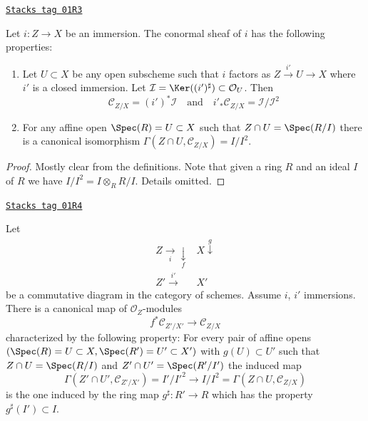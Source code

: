\begin{lemma}
\label{morphisms-lemma-affine-conormal}
\href{https://stacks.math.columbia.edu/tag/01R3}{\texttt{Stacks tag 01R3}}

Let $i : Z \to X$ be an immersion. The conormal sheaf
of $i$ has the following properties:
\begin{enumerate}
\item Let $U \subset X$ be any open subscheme such that $i$
factors as $Z \xrightarrow{i'} U \to X$ where $i'$ is a closed
immersion. Let $\mathcal{I} = \Ker((i')^\sharp) \subset \mathcal{O}_U$.
Then
$$
\mathcal{C}_{Z/X} = (i')^*\mathcal{I}\quad\text{and}\quad
i'_*\mathcal{C}_{Z/X} = \mathcal{I}/\mathcal{I}^2
$$
\item
For any affine open $\Spec(R) = U \subset X$
such that $Z \cap U = \Spec(R/I)$ there is a
canonical isomorphism
$\Gamma(Z \cap U, \mathcal{C}_{Z/X}) = I/I^2$.
\end{enumerate}
\end{lemma}

\begin{proof}
Mostly clear from the definitions. Note that given a ring $R$ and
an ideal $I$ of $R$ we have $I/I^2 = I \otimes_R R/I$. Details omitted.
\end{proof}

\begin{lemma}
\label{morphisms-lemma-conormal-functorial}
\href{https://stacks.math.columbia.edu/tag/01R4}{\texttt{Stacks tag 01R4}}

Let
$$
\begin{array}{cc}Z \underset{i}{\longrightarrow}\underset{f}{\downarrow} & X \overset{g}{\downarrow} \\ Z' \overset{i'}{\longrightarrow} & X'\end{array}
$$
be a commutative diagram in the category of schemes.
Assume $i$, $i'$ immersions. There is a canonical map
of $\mathcal{O}_Z$-modules
$$
f^*\mathcal{C}_{Z'/X'}
\longrightarrow
\mathcal{C}_{Z/X}
$$
characterized by the following property: For every pair of affine opens
$(\Spec(R) = U \subset X, \Spec(R') = U' \subset X')$ with
$g(U) \subset U'$ such that
$Z \cap U = \Spec(R/I)$ and $Z' \cap U' = \Spec(R'/I')$
the induced map
$$
\Gamma(Z' \cap U', \mathcal{C}_{Z'/X'}) = I'/I'^2
\longrightarrow
I/I^2 = \Gamma(Z \cap U, \mathcal{C}_{Z/X})
$$
is the one induced by the ring map $g^\sharp : R' \to R$ which
has the property $g^\sharp(I') \subset I$.
\end{lemma}

